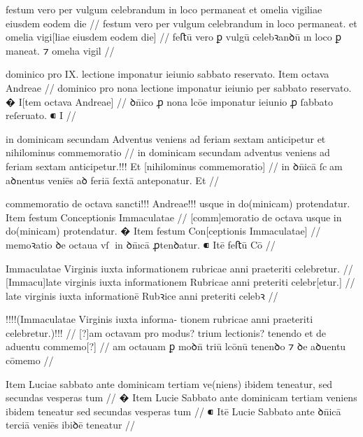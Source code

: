 \ex \bg
\gla
festum vero per vulgum celebrandum in loco permaneat et omelia vigiliae eiusdem eodem die 
//
\glRekonstrukcja
festum vero per vulgum celebrandum in loco permaneat. et omelia vigi[liae eiusdem eodem die]
//
\glU
{}
feﬅū vero ꝑ vulgū celebꝛanꝺū ın loco {ꝑ maneat.} ⁊ omelıa vigil   
//
\endgl
\xe




\ex \bg
\gla
{}
dominico pro IX. {} lectione imponatur ieiunio
{} sabbato reservato.
{} Item octava Andreae 
//
\glRekonstrukcja
{}
dominico pro {} nona lectione imponatur ieiunio per
sabbato reservato.
� I[tem octava Andreae]
//
\glU
{}
ꝺn̄ico ꝓ {} nona lcōe imponatur ieiunio ꝓ ſabbato reſeruato. ⁌ I  
//
\endgl
\xe


\ex \bg
\gla
{}
in dominicam secundam Adventus veniens
ad feriam sextam anticipetur et nihilominus commemoratio
//
\glRekonstrukcja
{}
in dominicam secundam adventus veniens
ad feriam sextam anticipetur.!!! Et [nihilominus commemoratio]
//
\glU
{}
in ꝺn̄icā ſcam aꝺnentus veniēs aꝺ feriā ſextā anteponatur. Et  
//
\endgl
\xe



\ex \bg
\gla
{}
commemoratio de octava
sancti!!! Andreae!!! usque in do(minicam) protendatur.
{} Item festum Conceptionis Immaculatae
//
\glRekonstrukcja
{}
[comm]emoratio de octava
{} {} usque in do(minicam) protendatur.
� Item festum Con[ceptionis Immaculatae]
//
\glU
{}
memoꝛatio ꝺe octaua {} {} vſ in ꝺn̄ıcā ꝓtenꝺatur. ⁌ Itē feﬅū Cō 
//
\endgl
\xe



\ex \bg
\gla
{}
Immaculatae Virginis iuxta informationem rubricae anni praeteriti celebretur.
//
\glRekonstrukcja
{}
[Immacu]late virginis iuxta informationem Rubricae anni preteriti celebr[etur.]
//
\glU
{}
late virginis iuxta informationē Rubꝛice anni preteriti celebꝛ
//
\endgl
\xe



\ex \bg
\gla
{}
!!!!(Immaculatae Virginis iuxta informa-
tionem rubricae anni praeteriti celebretur.)!!!
//
\glRekonstrukcja
{}
[?]am octavam pro modus? trium lectionis? tenendo et de aduentu commemo[?]
//
\glU
{}
am octauam ꝑ moꝺn̄ triū lcōnū tenenꝺo ⁊ ꝺe aꝺuentu cōmemo
//
\endgl
\xe



\ex \bg
\gla
{}
{} Item Luciae sabbato ante dominicam tertiam ve(niens) ibidem
teneatur, sed secundas vesperas tum 
//
\glRekonstrukcja
{}
� Item Lucie Sabbato ante dominicam tertiam veniens ibidem
teneatur {sed secundas vesperas tum}
//
\glU
{}
⁌ Itē Lucie Sabbato ante ꝺn̄icā terciā veniēs ibiꝺē teneatur     
//
\endgl
\xe

